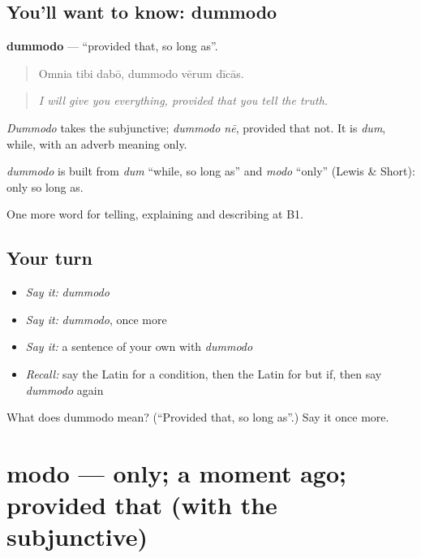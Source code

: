 \subsection*{You'll want to know: dummodo}
\textbf{dummodo} — \textquotedblleft{}provided that, so long as\textquotedblright{}.

\begin{quote}
Omnia tibi dabō, dummodo vērum dīcās.
\end{quote}

\begin{quote}
\emph{I will give you everything, provided that you tell the truth.}
\end{quote}

\emph{Dummodo} takes the subjunctive; \emph{dummodo nē}, provided that not. It is \emph{dum}, while, with an adverb meaning only.

\begin{cousinweb}
\emph{dummodo} is built from \emph{dum} \textquotedblleft{}while, so long as\textquotedblright{} and \emph{modo} \textquotedblleft{}only\textquotedblright{} (Lewis \& Short): only so long as.
\end{cousinweb}

\begin{grammarlens}[title={What you've built}]
One more word for telling, explaining and describing at B1.
\end{grammarlens}

\subsection*{Your turn}
\begin{itemize}
\raggedright
  \item \emph{Say it:} \emph{dummodo}
  \item \emph{Say it:} \emph{dummodo}, once more
  \item \emph{Say it:} a sentence of your own with \emph{dummodo}
  \item \emph{Recall:} say the Latin for a condition, then the Latin for but if, then say \emph{dummodo} again
\end{itemize}

\begin{tcolorbox}[breakable,colback=teal!4,colframe=teal!35!black,title={Before you move on}]
What does dummodo mean? (\textquotedblleft{}Provided that, so long as\textquotedblright{}.) Say it once more.
\end{tcolorbox}
\section[modo]{modo — only; a moment ago; provided that (with the subjunctive)}


